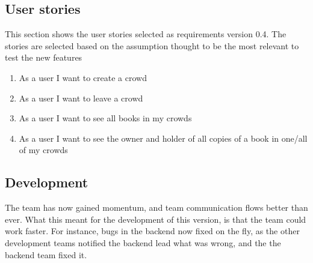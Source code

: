 \subsection{User stories}
\label{user-stories-v4}
This section shows the user stories selected as requirements version 0.4. The stories are selected based on the assumption thought to be the most relevant to test the new features 

\begin{enumerate}
  \item As a user I want to create a crowd
  \item As a user I want to leave a crowd
  \item As a user I want to see all books in my crowds
  \item As a user I want to see the owner and holder of all copies of a book in one/all of my crowds
\end{enumerate}

\subsection{Development}
The team has now gained momentum, and team communication flows better than ever. What this meant for the development of this version, is that the team could work faster. For instance, bugs in the \gls{backend} now fixed on the fly, as the other development teams notified the \gls{backend} lead what was wrong, and the the \gls{backend} team fixed it.

